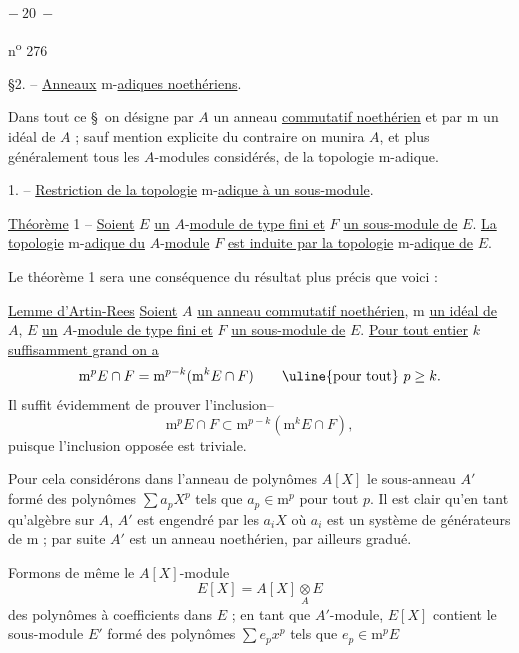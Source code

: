 

\begin{center}$-\ 20\ -$\end{center}\hfill n\textsuperscript{o} 276

\S2. -- \uline{Anneaux} $\mathrm m$-\uline{adiques noethériens}.

Dans tout ce \S\ on désigne par $A$ un anneau \uline{commutatif noethérien} et par $\mathrm m$ un idéal de $A$ ; sauf mention explicite du contraire on munira $A$, et plus généralement tous les $A$-modules considérés, de la topologie $\mathrm m$-adique.


1. -- \uline{Restriction de la topologie} $\mathrm m$-\uline{adique à un sous-module}.

\uline{Théorème} 1 -- \uline{Soient} $E$ \uline{un} $A$-\uline{module de type fini et} $F$ \uline{un sous-module de} $E$. \uline{La topologie} $\mathrm m$-\uline{adique du} $A$-\uline{module} $F$ \uline{est induite par la topologie} $\mathrm m$-\uline{adique de} $E$.

Le théorème 1 sera une conséquence du résultat plus précis que voici :

\uline{Lemme d'Artin-Rees} \unsure{--} \uline{Soient} $A$ \uline{un anneau commutatif noethérien}, $\mathrm m$ \uline{un idéal de} $A$, $E$ \uline{un} $A$-\uline{module de type fini et} $F$ \uline{un sous-module de} $E$. \uline{Pour tout entier} $k$ \uline{suffisamment grand on a}
\[
\mathrm m^pE\cap F=\mathrm m^{p-k}(\mathrm m^kE\cap F)\qquad\uline{\text{pour tout}}\ p\geq k.
\]
Il suffit évidemment de prouver l'inclusion\qquad --
\[
\mathrm m^pE\cap F\subset\mathrm m^{p-k}(\mathrm m^kE\cap F),
\]
puisque l'inclusion opposée est triviale.

Pour cela considérons dans l'anneau de polynômes $A[X]$ le sous-anneau $A'$ formé des polynômes $\sum a_pX^p$ tels que $a_p\in\mathrm m^p$ pour tout $p$. Il est clair qu'en tant qu'algèbre sur $A$, $A'$ est engendré par les $a_iX$ où $a_i$ est un système de générateurs de $\mathrm m$ ; par suite $A'$ est un anneau noethérien, par ailleurs gradué.

Formons de même le $A[X]$-module
\[
E[X]=A[X]\underset{A}{\otimes}E
\]
des polynômes à coefficients dans $E$ ; en tant que $A'$-module, $E[X]$ contient le sous-module $E'$ formé des polynômes $\sum e_px^p$ tels que $e_p\in\mathrm m^pE$
